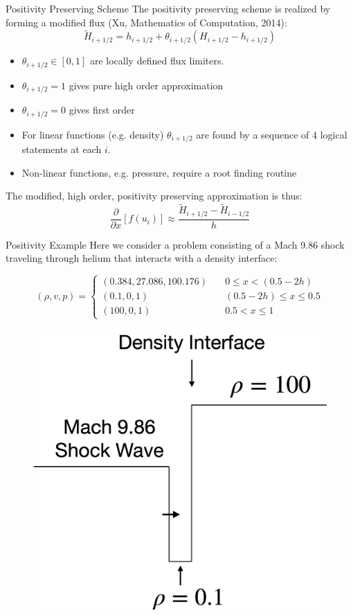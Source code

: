 \documentclass[10pt]{beamer}
\begin{document}
\begin{frame}{Positivity Preserving Scheme}
  The positivity preserving scheme is realized by forming a modified flux (Xu, Mathematics of Computation, 2014): 
  $$\tilde{H}_{i+1/2}=h_{i+1/2} + \theta_{i+1/2}(H_{i+1/2} - h_{i+1/2})$$
  
  \begin{itemize}
    \item $\theta_{i+1/2} \in [0,1]$ are locally defined flux limiters.
    \item $\theta_{i+1/2} =1$ gives pure high order approximation
    \item $\theta_{i+1/2} =0$ gives first order
    \item For linear functions (e.g. density) $\theta_{i+1/2}$ are found by a sequence of 4 logical statements at each $i$. 
    \item Non-linear functions, e.g. pressure, require a root finding routine
  \end{itemize}

  The modified, high order, positivity preserving approximation is thus:
  $$
  \frac{\partial}{\partial x}[f(u_i)] \approx \frac{\tilde{H}_{i+1 /2} - \tilde{H}_{i-1/2}}{h}
  $$
\end{frame}

\begin{frame}{Positivity Example}
  Here we consider a problem consisting of a Mach 9.86 shock traveling through helium that interacts with a density interface:

  $$
  (\rho, v, p) = 
  \begin{cases} 
  (0.384,27.086,100.176)& \quad 0 \leq x < (0.5 - 2h) \\
  (0.1,0,1)& \quad (0.5 - 2h) \leq x \leq 0.5\\
  (100,0,1)& \quad  0.5 < x \leq 1
  \end{cases}
  $$
  \begin{figure}[H]
    \centering
    \includegraphics[scale=0.175]{ShockWave.png}
    \end{figure}
\end{frame}
\end{document}
